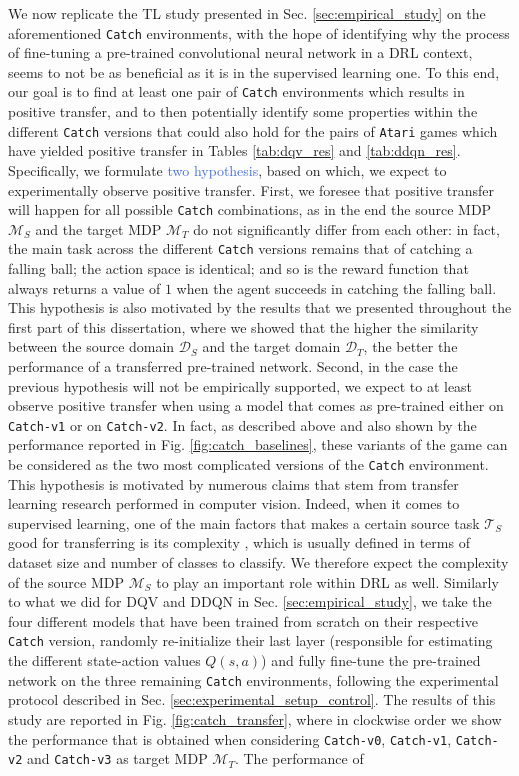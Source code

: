 We now replicate the TL study presented in Sec. \ref{sec:empirical_study} on the aforementioned \texttt{Catch} environments, with the hope of identifying why the process of fine-tuning a pre-trained convolutional neural network in a DRL context, seems to not be as beneficial as it is in the supervised learning one. To this end, our goal is to find at least one pair of \texttt{Catch} environments which results in positive transfer, and to then potentially identify some properties within the different \texttt{Catch} versions that could also hold for the pairs of \texttt{Atari} games which have yielded positive transfer in Tables \ref{tab:dqv_res} and \ref{tab:ddqn_res}. Specifically, we formulate \textcolor{RoyalBlue}{two hypothesis}, based on which, we expect to experimentally observe positive transfer. First, we foresee that positive transfer will happen for all possible \texttt{Catch} combinations, as in the end the source MDP $\mathcal{M}_S$ and the target MDP $\mathcal{M}_T$ do not significantly differ from each other: in fact, the main task across the different \texttt{Catch} versions remains that of catching a falling ball; the action space is identical; and so is the reward function that always returns a value of $1$ when the agent succeeds in catching the falling ball. This hypothesis is also motivated by the results that we presented throughout the first part of this dissertation, where we showed that the higher the similarity between the source domain $\mathcal{D}_S$ and the target domain $\mathcal{D}_T$, the better the performance of a transferred pre-trained network. Second, in the case the previous hypothesis will not be empirically supported, we expect to at least observe positive transfer when using a model that comes as pre-trained either on \texttt{Catch-v1} or on \texttt{Catch-v2}. In fact, as described above and also shown by the performance reported in Fig. \ref{fig:catch_baselines}, these variants of the game can be considered as the two most complicated versions of the \texttt{Catch} environment. This hypothesis is motivated by numerous claims that stem from transfer learning research performed in computer vision. Indeed, when it comes to supervised learning, one of the main factors that makes a certain source task $\mathcal{T}_S$ good for transferring is its complexity \cite{mensink2021factors}, which is usually defined in terms of dataset size and number of classes to classify. We therefore expect the complexity of the source MDP $\mathcal{M}_S$ to play an important role within DRL as well. Similarly to what we did for DQV and DDQN in Sec. \ref{sec:empirical_study}, we take the four different models that have been trained from scratch on their respective \texttt{Catch} version, randomly re-initialize their last layer (responsible for estimating the different state-action values $Q(s,a)$) and fully fine-tune the pre-trained network on the three remaining \texttt{Catch} environments, following the experimental protocol described in Sec. \ref{sec:experimental_setup_control}. The results of this study are reported in Fig. \ref{fig:catch_transfer}, where in clockwise order we show the performance that is obtained when considering \texttt{Catch-v0}, \texttt{Catch-v1}, \texttt{Catch-v2} and \texttt{Catch-v3} as target MDP $\mathcal{M}_T$. The performance of 